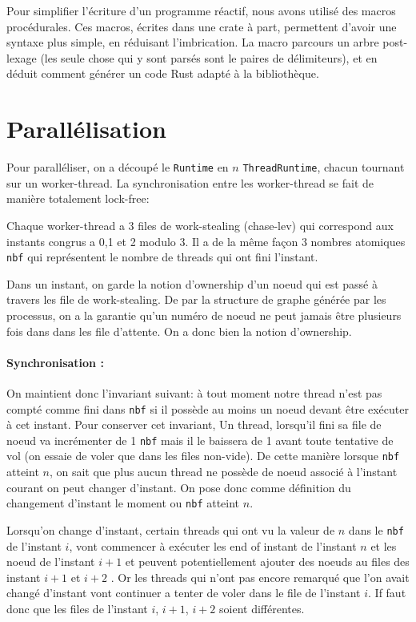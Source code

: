 \documentclass[a4paper]{article}
\renewcommand{\(}{\left(}
\renewcommand{\)}{\right)}
\begin{document}
Pour simplifier l'écriture d'un programme réactif, nous avons utilisé des macros
procédurales. Ces macros, écrites dans une crate à part, permettent d'avoir une
syntaxe plus simple, en réduisant l'imbrication. La macro parcours un arbre
post-lexage (les seule chose qui y sont parsés sont le paires de délimiteurs),
et en déduit comment générer un code Rust adapté à la bibliothèque.

\section{Parallélisation}

Pour paralléliser, on a découpé le \verb!Runtime! en $n$ \verb!ThreadRuntime!,
chacun tournant sur un worker-thread. La synchronisation entre les worker-thread
se fait de manière totalement lock-free:

Chaque worker-thread a 3 files de work-stealing (chase-lev) qui correspond aux
instants congrus a 0,1 et 2 modulo 3. Il a de la même façon 3 nombres atomiques \verb!nbf! qui
représentent le nombre de threads qui ont fini l'instant.

Dans un instant, on garde la notion d'ownership d'un noeud qui est passé à
travers les file de work-stealing. De par la structure de graphe générée par les
processus, on a la garantie qu'un numéro de noeud ne peut jamais être plusieurs
fois dans dans les file d'attente. On a donc bien la notion d'ownership.

\paragraph{Synchronisation :} On maintient donc l'invariant suivant: à tout
moment notre thread n'est pas compté comme
fini dans \verb!nbf! si il possède au moins un noeud devant être exécuter à cet
instant. Pour conserver cet invariant, Un thread, lorsqu'il fini sa
file de noeud va incrémenter de 1 \verb!nbf! mais il le baissera de 1 avant
toute tentative de vol (on essaie de voler que dans les files non-vide). De cette
manière lorsque \verb!nbf! atteint $n$, on sait que plus aucun thread ne possède
de noeud associé à l'instant courant on peut changer d'instant. On pose donc
comme définition du changement d'instant le moment ou \verb!nbf! atteint $n$.

Lorsqu'on change d'instant, certain threads qui ont \og vu\fg{} la valeur de $n$
dans le \verb!nbf! de l'instant $i$, vont commencer à exécuter les end of
instant de l'instant $n$ et les noeud de l'instant $i+1$ et
peuvent potentiellement ajouter des noeuds au files des instant $i+1$ et $i+2$ .
Or les threads qui n'ont pas encore remarqué que l'on avait changé d'instant
vont continuer a tenter de voler dans le file de l'instant $i$. If faut donc que
les files de l'instant $i$, $i+1$, $i+2$ soient différentes.
\end{document}
